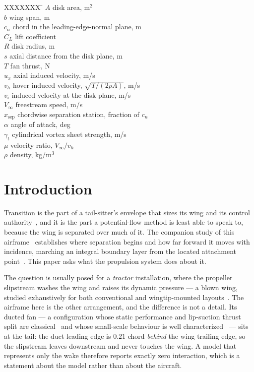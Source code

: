 \documentclass[submit]{aiaa-tc}%
\begin{document}
\begin{tabbing}
  XXXXXXX \= \kill
  $A$ \> disk area, m$^2$ \\
  $b$ \> wing span, m \\
  $c_n$ \> chord in the leading-edge-normal plane, m \\
  $C_L$ \> lift coefficient \\
  $R$ \> disk radius, m \\
  $s$ \> axial distance from the disk plane, m \\
  $T$ \> fan thrust, N \\
  $u_x$ \> axial induced velocity, m/s \\
  $v_h$ \> hover induced velocity, $\sqrt{T/(2\rho A)}$, m/s \\
  $v_i$ \> induced velocity at the disk plane, m/s \\
  $V_\infty$ \> freestream speed, m/s \\
  $x_{\text{sep}}$ \> chordwise separation station, fraction of $c_n$ \\
  $\alpha$ \> angle of attack, deg \\
  $\gamma_t$ \> cylindrical vortex sheet strength, m/s \\
  $\mu$ \> velocity ratio, $V_\infty / v_h$ \\
  $\rho$ \> density, kg/m$^3$ \\
\end{tabbing}

\section{Introduction}

Transition is the part of a tail-sitter's envelope that sizes its wing and
its control authority~\cite{stone2008,ozdemir2014}, and it is the part a potential-flow method is least
able to speak to, because the wing is separated over much of it. The
companion study of this airframe~\cite{aeolion2026} establishes where
separation begins and how far forward it moves with incidence, marching an
integral boundary layer from the located attachment
point~\cite{thwaites1949,cebeciCousteix2005}. This paper asks what the
propulsion system does about it.

The question is usually posed for a \emph{tractor} installation, where the
propeller slipstream washes the wing and raises its dynamic pressure --- a
blown wing, studied exhaustively for both conventional and wingtip-mounted
layouts~\cite{veldhuis2005,sinnigeEtAl2019}. The airframe here is the other
arrangement, and the difference is not a detail. Its ducted fan --- a configuration whose static performance and
lip-suction thrust split are classical~\cite{kruger1949,blackReddy1968} and
whose small-scale behaviour is well
characterized~\cite{pereira2008} --- sits at the tail: the duct leading edge is $0.21$ chord \emph{behind} the wing
trailing edge, so the slipstream leaves downstream and never touches the
wing. A model that represents only the wake therefore reports exactly zero
interaction, which is a statement about the model rather than about the
aircraft.
\end{document}
